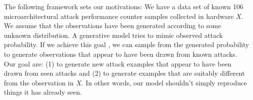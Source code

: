  
 The following framework sets our motivations:
  We have a data set of known 106  microarchitectural attack performance counter samples collected in hardware $X$. 
 We assume that the observations have been generated according to some unknown distribution. 
 A generative model tries to mimic observed attack probability. If we achieve this goal , we can sample from the generated probability to generate observations that appear to have been drawn from known attacks. Our goal are: (1) to generate new attack examples that appear to have been drawn from seen attacks and (2) to generate examples that are suitably different from the observation in $X$. In other words, our model shouldn't simply reproduce things it has already seen. 

